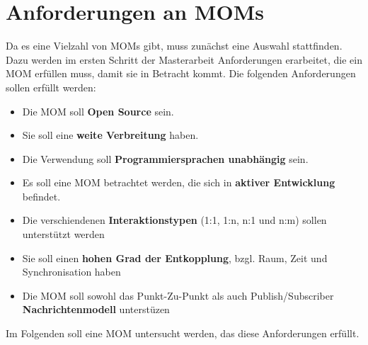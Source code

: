 \section{Anforderungen an MOMs}
\label{sec:anforderungenMom}
Da es eine Vielzahl von MOMs gibt, muss zunächst eine Auswahl stattfinden. Dazu werden im ersten Schritt der Masterarbeit Anforderungen erarbeitet, die ein MOM erfüllen muss, damit sie in Betracht kommt. Die folgenden Anforderungen sollen erfüllt werden:
\begin{itemize}
\item Die MOM soll \textbf{Open Source} sein.
\item Sie soll eine \textbf{weite Verbreitung} haben.
\item Die Verwendung soll \textbf{Programmiersprachen unabhängig} sein.
\item Es soll eine MOM betrachtet werden, die sich in \textbf{aktiver Entwicklung} befindet.
\item Die verschiendenen \textbf{Interaktionstypen} (1:1, 1:n, n:1 und n:m) sollen unterstützt werden
\item Sie soll einen \textbf{hohen Grad der Entkopplung}, bzgl. Raum, Zeit und Synchronisation haben
\item Die MOM soll sowohl das Punkt-Zu-Punkt als auch Publish/Subscriber \textbf{Nachrichtenmodell} unterstüzen
\end{itemize}

Im Folgenden soll eine MOM untersucht werden, das diese Anforderungen erfüllt.

